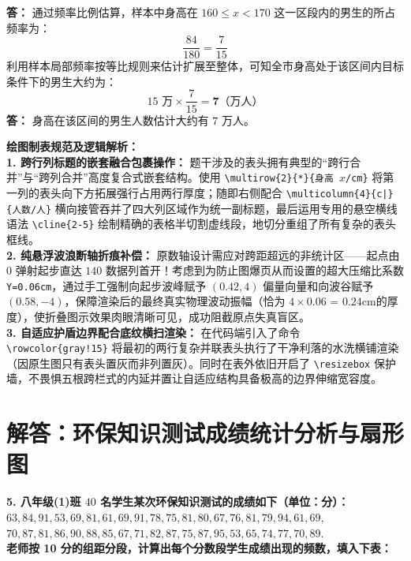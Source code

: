 \vspace{0.2cm}
\textbf{答：} 通过频率比例估算，样本中身高在 $160 \leqslant x < 170$ 这一区段内的男生的所占频率为：
$$\frac{84}{180} = \frac{7}{15}$$
利用样本局部频率按等比规则来估计扩展至整体，可知全市身高处于该区间内目标条件下的男生大约为：
$$15\text{ 万} \times \frac{7}{15} = \boldsymbol{7}\text{（万人）}$$
\textbf{答：} 身高在该区间的男生人数估计大约有 $7$ 万人。

\vspace{0.6cm}

{\small\color{blue!70!black}
\textbf{绘图制表规范及逻辑解析：}\\
\textbf{1. 跨行列标题的嵌套融合包裹操作：} 题干涉及的表头拥有典型的“跨行合并”与“跨列合并”高度复合式嵌套结构。使用 \texttt{\textbackslash multirow\{2\}\{*\}\{身高 $x$/cm\}} 将第一列的表头向下方拓展强行占用两行厚度；随即右侧配合 \texttt{\textbackslash multicolumn\{4\}\{c|\}\{人数/人\}} 横向接管吞并了四大列区域作为统一副标题，最后运用专用的悬空横线语法 \texttt{\textbackslash cline\{2-5\}} 绘制精确的表格半切割虚线段，地切分重组了所有复杂的表头框线。\\
\textbf{2. 纯悬浮波浪断轴折痕补偿：} 原数轴设计需应对跨距超远的非统计区——起点由 $0$ 弹射起步直达 $140$ 数据列首开！考虑到为防止图爆页从而设置的超大压缩比系数 \texttt{Y=0.06cm}，通过手工强制向起步波峰赋予 $(0.42, 4)$ 偏量向量和向波谷赋予 $(0.58, -4)$，保障渲染后的最终真实物理波动振幅（恰为 $4 \times 0.06$ = $0.24\text{cm}$的厚度），使折叠图示效果肉眼清晰可见，成功阻截原点失真盲区。\\
\textbf{3. 自适应护盾边界配合底纹横扫渲染：} 在代码端引入了命令 \texttt{\textbackslash rowcolor\{gray!15\}} 将最初的两行复杂并联表头执行了干净利落的水洗横铺渲染（因原生图只有表头置灰而非列置灰）。同时在表外依旧开启了 \texttt{\textbackslash resizebox} 保护墙，不畏惧五根跨栏式的内延并置让自适应结构具备极高的边界伸缩宽容度。
}

\newpage



\section{解答：环保知识测试成绩统计分析与扇形图}

\vspace{0.6cm}

\textbf{5. 八年级(1)班 $40$ 名学生某次环保知识测试的成绩如下（单位：分）：\\
$63, 84, 91, 53, 69, 81, 61, 69, 91, 78, 75, 81, 80, 67, 76, 81, 79, 94, 61, 69,$ \\
$70, 87, 81, 86, 90, 88, 85, 67, 71, 82, 87, 75, 87, 95, 53, 65, 74, 77, 70, 89.$ \\
老师按 10 分的组距分段，计算出每个分数段学生成绩出现的频数，填入下表：}

